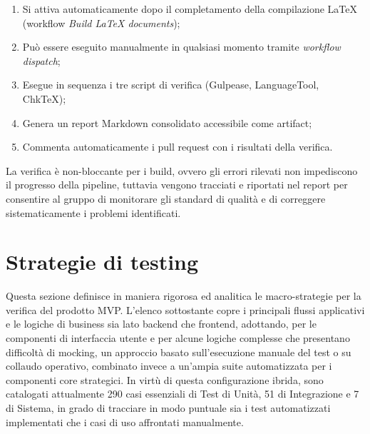 \documentclass[a4paper,11pt,oneside]{scrartcl}
\begin{document}
\begin{enumerate}
    \item Si attiva automaticamente dopo il completamento della compilazione \LaTeX{} (workflow \textit{Build LaTeX documents});
    \item Può essere eseguito manualmente in qualsiasi momento tramite \textit{workflow dispatch};
    \item Esegue in sequenza i tre script di verifica (Gulpease, LanguageTool, ChkTeX);
    \item Genera un report Markdown consolidato accessibile come artifact;
    \item Commenta automaticamente i pull request con i risultati della verifica.
\end{enumerate}

La verifica è non-bloccante per i build, ovvero gli errori rilevati non impediscono il progresso della pipeline, tuttavia vengono tracciati e riportati nel report per consentire al gruppo di monitorare gli standard di qualità e di correggere sistematicamente i problemi identificati.

\section{Strategie di testing}

Questa sezione definisce in maniera rigorosa ed analitica le macro-strategie per la verifica del prodotto MVP. L'elenco sottostante copre i principali flussi applicativi e le logiche di business sia lato backend che frontend, adottando, per le componenti di interfaccia utente e per alcune logiche complesse che presentano difficoltà di mocking, un approccio basato sull'esecuzione manuale del test o su collaudo operativo, combinato invece a un'ampia suite automatizzata per i componenti core strategici. In virtù di questa configurazione ibrida, sono catalogati attualmente 290 casi essenziali di Test di Unità, 51 di Integrazione e 7 di Sistema, in grado di tracciare in modo puntuale sia i test automatizzati implementati che i casi di uso affrontati manualmente.
\end{document}

